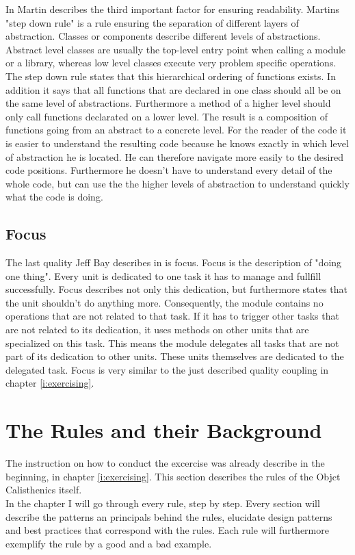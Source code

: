 In \cite{cc} Martin describes the third important factor for ensuring readability. Martins "step down rule" is a rule ensuring the separation of different layers of abstraction. Classes or components describe different levels of abstractions. Abstract level classes are usually the top-level entry point when calling a module or a library, whereas low level classes execute very problem specific operations. The step down rule states that this hierarchical ordering of functions exists. In addition it says that all functions that are declared in one class should all be on the same level of abstractions. Furthermore a method of a higher level should only call functions declarated on a lower level. The result is a composition of functions going from an abstract to a concrete level. For the reader of the code it is easier to understand the resulting code because he knows exactly in which level of abstraction he is located. He can therefore navigate more easily to the desired code positions. Furthermore he doesn't have to understand every detail of the whole code, but can use the the higher levels of abstraction to understand quickly what the code is doing. 

\subsection*{Focus}
\label{focus}
The last quality Jeff Bay describes in \cite{oc2008} is focus. Focus is the description of "doing one thing". Every unit is dedicated to one task it has to manage and fullfill successfully. Focus describes not only this dedication, but furthermore states that the unit shouldn't do anything more. Consequently, the module contains no operations that are not related to that task. If it has to trigger other tasks that are not related to its dedication, it uses methods on other units that are specialized on this task. This means the module delegates all tasks that are not part of its dedication to other units. These units themselves are dedicated to the delegated task. Focus is very similar to the just described quality coupling in chapter \ref{i:exercising}.

\section{The Rules and their Background}
\label{d:background}
 The instruction on how to conduct the excercise was already describe in the beginning, in chapter \ref{i:exercising}. This section describes the rules of the Objct Calisthenics itself. \\
 In the chapter I will go through every rule, step by step. Every section will describe the patterns an principals behind the rules, elucidate design patterns and best practices that correspond with the rules. Each rule will furthermore exemplify the rule by a good and a bad example. 

